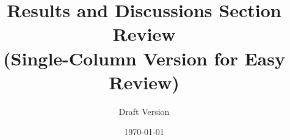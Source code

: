 \documentclass[12pt,a4paper]{article}
\begin{document}
\title{Results and Discussions Section Review\\
\large (Single-Column Version for Easy Review)}
\author{Draft Version}
\date{\today}
\maketitle



\end{document}
